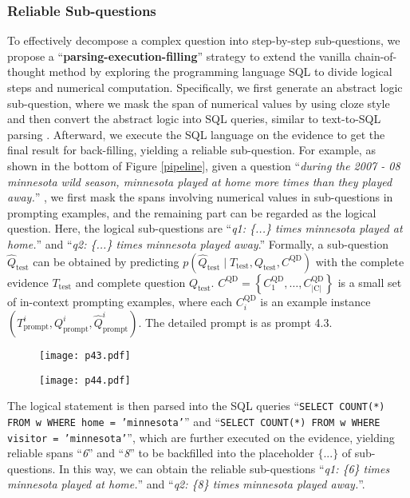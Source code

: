 \subsubsection{Reliable Sub-questions}
To effectively decompose a complex question into step-by-step sub-questions, we propose a ``\textbf{parsing-execution-filling}'' strategy to extend the vanilla chain-of-thought method by exploring the programming language SQL to divide logical steps and numerical computation. 
Specifically, we first generate an abstract logic sub-question, where we mask the span of numerical values by using cloze style and then convert the abstract logic into SQL queries, similar to text-to-SQL parsing \citep{Qin2022ASO,Wang2022ProtonPS}. 
Afterward, we execute the SQL language on the evidence to get the final result for back-filling, yielding a reliable sub-question.
For example, as shown in the bottom of Figure \ref{pipeline}, given a question 
``\textit{during the 2007 - 08 minnesota wild season, minnesota played at home more times than they played away.}''
, we first mask the spans involving numerical values in sub-questions in prompting examples, and the remaining part can be regarded as the logical question. Here, the logical sub-questions are 
``\textit{q1: \{...\} times minnesota played at home.}'' and ``\textit{q2: \{...\} times minnesota played away}.'' Formally, a sub-question $\hat{Q}_{\text{test}}$ can be obtained by predicting $p(\hat{Q}_\text{test} \mid T_{\text{test}}, Q_{\text{test}}, C^{\text{QD}})$ with the complete evidence $T_{\text{test}}$ and complete question $Q_{\text{test}}$. 
$C^{\text{QD}}=\left\{C^{\text{QD}}_1, \ldots, C^{\text{QD}}_{|\text{C}|}\right\}$ is a small set of in-context prompting examples, where each $C^{\text{QD}}_i$ is an example instance $(T_{\text{prompt}}^i, Q_{\text{prompt}}^i, \hat{Q}_{\text{prompt}}^i)$.
The detailed prompt is as prompt 4.3.
\begin{figure}[htbp]
\centering
\begin{minipage}[t]{0.48\textwidth}
\centering
\texttt{[image: p43.pdf]}
\end{minipage}
\begin{minipage}[t]{0.48\textwidth}
\centering
\texttt{[image: p44.pdf]}
\end{minipage}
\end{figure}

The logical statement is then parsed into the SQL queries ``\texttt{SELECT COUNT(*) FROM w WHERE home = 'minnesota'}'' and 
``\texttt{SELECT COUNT(*) FROM w WHERE visitor = 'minnesota'}'',
which are further executed on the evidence, yielding reliable spans ``\textit{6}'' and ``\textit{8}'' to be backfilled into the placeholder $\{...\}$ of sub-questions. In this way, we can obtain the reliable sub-questions 
``\textit{q1: \{6\} times minnesota played at home.}''
and ``\textit{q2: \{8\} times minnesota played away.}''. 

